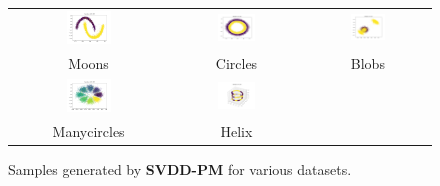 \documentclass[11pt]{article}
\begin{document}
\begin{figure}[H]
    \centering
    \begin{tabular}{ccc}
        \includegraphics[width=0.3\textwidth]{exps/ddpm_2_150_0.0001_0.02_moons/samples_svdd_150.png} &
        \includegraphics[width=0.3\textwidth]{exps/ddpm_2_150_0.0001_0.02_circles/samples_svdd_150.png} &
        \includegraphics[width=0.3\textwidth]{exps/ddpm_2_150_0.0001_0.02_blobs/samples_svdd_150.png} \\
        Moons & Circles & Blobs \\[0.5em]
        
        
        \includegraphics[width=0.3\textwidth]{exps/ddpm_2_150_0.0001_0.02_manycircles/samples_svdd_150.png} &
        \includegraphics[width=0.3\textwidth]{exps/ddpm_3_150_0.0001_0.02_helix/samples_svdd_150.png} & \\
        Manycircles & Helix & \\
    \end{tabular}
    \caption{Samples generated by \textbf{SVDD-PM} for various datasets.}
    \label{fig:svdd_all_data}
\end{figure}



\end{document}
